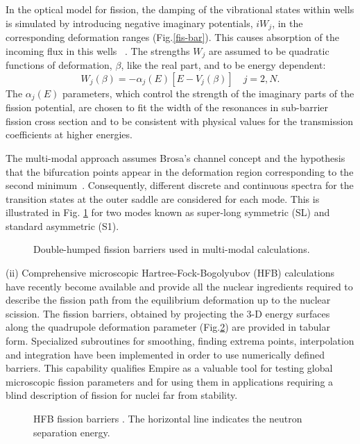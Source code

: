 \documentclass[twocolumn,amsmath,amssymb,10pt,groupedaddress,a4paper]{revtex4}
\begin{document}
In the optical model for fission, the damping of the vibrational states within wells is
simulated by introducing negative imaginary potentials, $iW_j$, in the corresponding
deformation ranges (Fig.\ref{fis-bar}).
This causes absorption of the incoming flux in this wells
~\cite{Bjornholm:80, Bhandari:79, Back:74}. The strengths $W_j$ are assumed to be
quadratic functions of
deformation, $\beta$, like the real part,  and to be energy dependent$:$
%
\begin{equation}
W_j(\beta)=-\alpha_j(E)[E-V_j(\beta)]\quad j=2,N.
\end{equation}
%
The $\alpha_j(E)$ parameters, which control the strength of the imaginary parts
of the fission potential, are chosen to fit the width of the resonances
in sub-barrier fission cross section and to be consistent with physical values
for the transmission coefficients at higher energies.

The multi-modal approach assumes Brosa's channel concept and the hypothesis that the
bifurcation points appear in the deformation region corresponding to the second
minimum~\cite{Brosa:90-multimodal}. Consequently, different discrete and continuous spectra
for the transition states at the outer saddle are considered for each
mode. This is illustrated in Fig. \ref{fis-multimod}
for two modes known as super-long symmetric (SL) and standard asymmetric
(S1).

%
\begin{figure}[htbp]
\caption{Double-humped fission barriers used in multi-modal calculations.}
\label{fis-multimod}
\end{figure}
%

(ii)
Comprehensive microscopic Hartree-Fock-Bogolyubov (HFB) calculations \cite{Goriely:07-mass}
have recently become available and provide all the nuclear ingredients required to
describe the fission path from the equilibrium deformation up to the nuclear scission.
The fission barriers, obtained by projecting the 3-D energy surfaces along the quadrupole
deformation parameter (Fig.\ref{fis-tot-bar}) are provided in tabular form. Specialized subroutines for smoothing,
finding extrema points, interpolation and integration have been implemented in order
to use numerically defined barriers. This capability qualifies Empire as a valuable tool for
testing global microscopic fission parameters and for using them in applications
requiring a blind description of fission for nuclei far from stability.
%
\begin{figure}[htbp]
\caption{HFB fission barriers \cite{Goriely:07-mass}. The horizontal line indicates the neutron separation energy.}
\label{fis-tot-bar}
\end{figure}
%
\\
\end{document}

